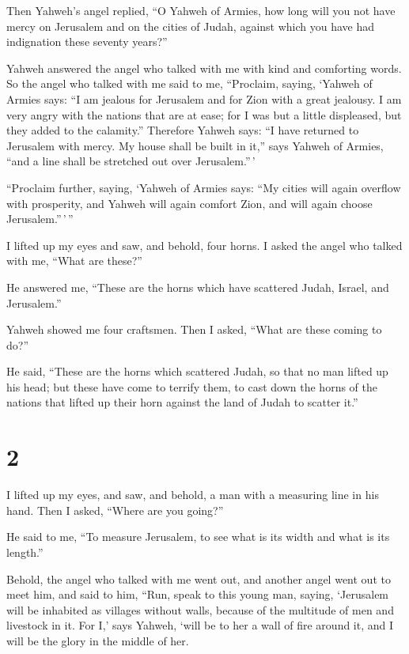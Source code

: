  Then Yahweh's angel replied, ``O Yahweh of Armies, how
long will you not have mercy on Jerusalem and on the cities of Judah,
against which you have had indignation these seventy years?''

 Yahweh answered the angel who talked with me with kind
and comforting words.  So the angel who talked with me
said to me, ``Proclaim, saying, `Yahweh of Armies says: ``I am jealous
for Jerusalem and for Zion with a great jealousy.  I am
very angry with the nations that are at ease; for I was but a little
displeased, but they added to the calamity.''  Therefore
Yahweh says: ``I have returned to Jerusalem with mercy. My house shall
be built in it,'' says Yahweh of Armies, ``and a line shall be stretched
out over Jerusalem.''\,'

 ``Proclaim further, saying, `Yahweh of Armies says: ``My
cities will again overflow with prosperity, and Yahweh will again
comfort Zion, and will again choose Jerusalem.''\,'\,''

 I lifted up my eyes and saw, and behold, four horns.
 I asked the angel who talked with me, ``What are
these?''

He answered me, ``These are the horns which have scattered Judah,
Israel, and Jerusalem.''

 Yahweh showed me four craftsmen.  Then I
asked, ``What are these coming to do?''

He said, ``These are the horns which scattered Judah, so that no man
lifted up his head; but these have come to terrify them, to cast down
the horns of the nations that lifted up their horn against the land of
Judah to scatter it.''

\hypertarget{section-1}{%
\section{2}\label{section-1}}

 I lifted up my eyes, and saw, and behold, a man with a
measuring line in his hand.  Then I asked, ``Where are you
going?''

He said to me, ``To measure Jerusalem, to see what is its width and what
is its length.''

 Behold, the angel who talked with me went out, and
another angel went out to meet him,  and said to him,
``Run, speak to this young man, saying, `Jerusalem will be inhabited as
villages without walls, because of the multitude of men and livestock in
it.  For I,' says Yahweh, `will be to her a wall of fire
around it, and I will be the glory in the middle of her.

